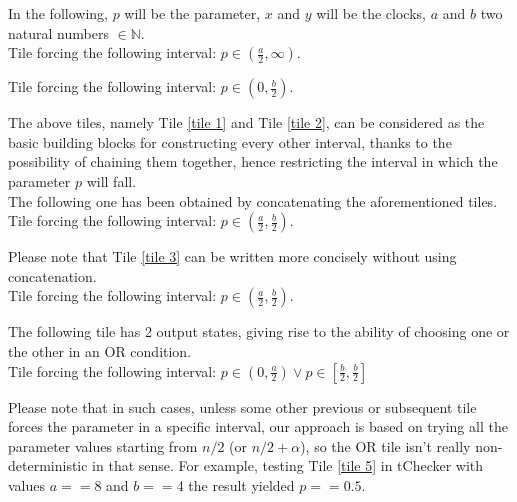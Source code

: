 \documentclass[12pt, a4paper]{article}
\begin{document}

\noindent
In the following, $p$ will be the parameter, $x$ and $y$ will be the clocks, $a$ and $b$ two natural numbers $\in \mathbb{N}$.\\

Tile forcing the following interval: $p \in (\frac{a}{2}, \infty)$.



\bigskip

Tile forcing the following interval: $p \in (0, \frac{b}{2})$.



\noindent
The above tiles, namely Tile \ref{tile 1} and Tile \ref{tile 2}, can be considered as the basic building blocks for constructing every other interval, thanks to the possibility of chaining them together, hence restricting the interval in which the parameter $p$ will fall.\\

\noindent
The following one has been obtained by concatenating the aforementioned tiles.\\

Tile forcing the following interval: $p \in (\frac{a}{2}, \frac{b}{2})$.



\noindent
Please note that Tile \ref{tile 3} can be written more concisely without using concatenation.\\

Tile forcing the following interval: $p \in (\frac{a}{2}, \frac{b}{2})$.



\newpage

\noindent
The following tile has 2 output states, giving rise to the ability of choosing one or the other in an OR condition.\\

Tile forcing the following interval: $p \in (0, \frac{a}{2}) \vee p \in [\frac{b}{2}, \frac{b}{2}]$



\noindent
Please note that in such cases, unless some other previous or subsequent tile forces the parameter in a specific interval, our approach is based on trying all the parameter values starting from $n /2$ (or $n / 2 + \alpha$), so the OR tile isn't really non-deterministic in that sense. For example, testing Tile \ref{tile 5} in tChecker with values $a == 8$ and $b == 4$ the result yielded $p == 0.5$.\\
\end{document}
